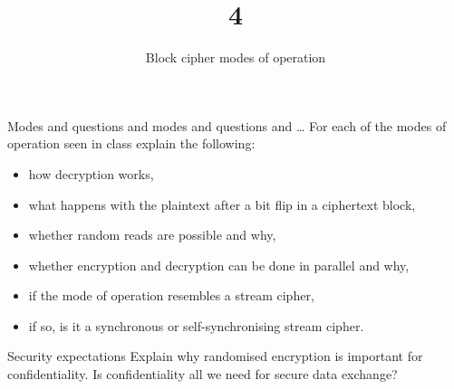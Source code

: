 \documentclass{practice}
\title{4}
\subtitle{Block cipher modes of operation}
\date{\DTMdate{2024-10-02}}
\begin{document}
\maketitle

\begin{task}{Modes and questions and modes and questions and \dots}
  For each of the modes of operation seen in class explain the following:
  \begin{itemize}
    \item how decryption works,
    \item what happens with the plaintext after a bit flip in a ciphertext block,
    \item whether random reads are possible and why,
    \item whether encryption and decryption can be done in parallel and why,
    \item if the mode of operation resembles a stream cipher,
    \item if so, is it a synchronous or self-synchronising stream cipher.
  \end{itemize}
\end{task}

\begin{task}{Security expectations}
  Explain why randomised encryption is important for confidentiality.
  Is confidentiality all we need for secure data exchange?
\end{task}
\end{document}

